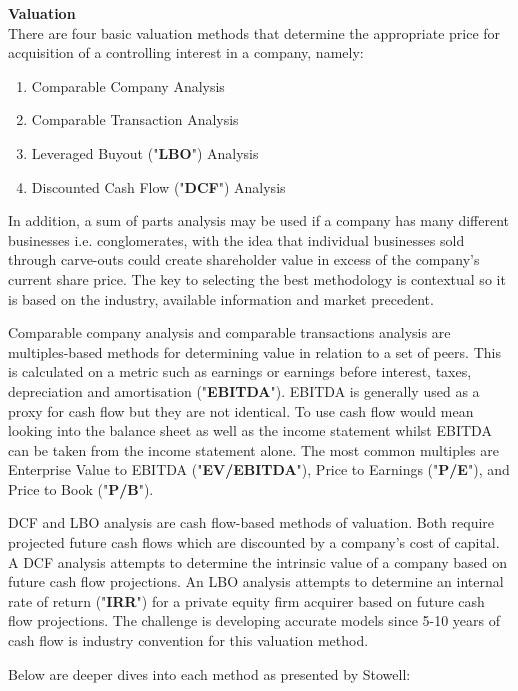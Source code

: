 \documentclass[10pt, a4paper]{article}
\begin{document}
\vspace{10pt}
\noindent \textbf{Valuation}\\
There are four basic valuation methods that determine the appropriate price for acquisition of a controlling interest in a company, namely:
\begin{enumerate}
	\item Comparable Company Analysis
	\item Comparable Transaction Analysis
	\item Leveraged Buyout ("\textbf{LBO}") Analysis
	\item Discounted Cash Flow ("\textbf{DCF}") Analysis
\end{enumerate}
In addition, a sum of parts analysis may be used if a company has many different businesses i.e. conglomerates, with the idea that individual businesses sold through carve-outs could create shareholder value in excess of the company's current share price. The key to selecting the best methodology is contextual so it is based on the industry, available information and market precedent.

\vspace{5pt}
\noindent Comparable company analysis and comparable transactions analysis are multiples-based methods for determining value in relation to a set of peers. This is calculated on a metric such as earnings or earnings before interest, taxes, depreciation and amortisation ("\textbf{EBITDA}"). EBITDA is generally used as a proxy for cash flow but they are not identical. To use cash flow would mean looking into the balance sheet as well as the income statement whilst EBITDA can be taken from the income statement alone. The most common multiples are Enterprise Value to EBITDA ("\textbf{EV/EBITDA}"), Price to Earnings ("\textbf{P/E}"), and Price to Book  ("\textbf{P/B}").

\vspace{5pt}
\noindent DCF and LBO analysis are cash flow-based methods of valuation. Both require projected future cash flows which are discounted by a company's cost of capital. A DCF analysis attempts to determine the intrinsic value of a company based on future cash flow projections. An LBO analysis attempts to determine an internal rate of return ("\textbf{IRR}") for a private equity firm acquirer based on future cash flow projections. The challenge is developing accurate models since 5-10 years of cash flow is industry convention for this valuation method.

\vspace{5pt}
\noindent Below are deeper dives into each method as presented by Stowell:
\end{document}
